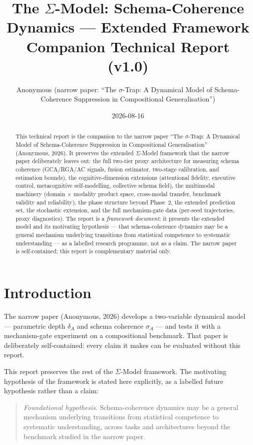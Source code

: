 \documentclass[11pt]{article}
\title{The $\Sigma$-Model: Schema-Coherence Dynamics --- Extended Framework\\
\large Companion Technical Report (v1.0)}
\author{Anonymous (narrow paper: ``The $\sigma$-Trap: A Dynamical Model of
Schema-Coherence Suppression in Compositional Generalisation'')}
\date{2026-08-16}
\theoremstyle{definition}
\theoremstyle{plain}
\begin{document}
\maketitle

\begin{abstract}
This technical report is the companion to the narrow paper ``The
$\sigma$-Trap: A Dynamical Model of Schema-Coherence Suppression in
Compositional Generalisation'' (Anonymous, 2026). It preserves the extended
$\Sigma$-Model framework that the narrow paper deliberately leaves out:
the full two-tier proxy architecture for measuring schema coherence
(GCA/RGA/AC signals, fusion estimator, two-stage calibration, and
estimation bounds), the cognitive-dimension extensions (attentional
fidelity, executive control, metacognitive self-modelling, collective
schema field), the multimodal machinery (domain $\times$ modality
product space, cross-modal transfer, benchmark validity and
reliability), the phase structure beyond Phase~2, the extended
prediction set, the stochastic extension, and the full mechanism-gate
data (per-seed trajectories, proxy diagnostics). The report is a
\emph{framework document}: it presents the extended model and its
motivating hypothesis --- that schema-coherence dynamics may be a
general mechanism underlying transitions from statistical competence to
systematic understanding --- as a labelled research programme, not as a
claim. The narrow paper is self-contained; this report is complementary
material only.
\end{abstract}

\section{Introduction}\label{sec:intro}

The narrow paper (Anonymous, 2026) develops a two-variable dynamical model
--- parametric depth $\delta_A$ and schema coherence $\sigma_A$ --- and
tests it with a mechanism-gate experiment on a compositional benchmark.
That paper is deliberately self-contained: every claim it makes can be
evaluated without this report.

This report preserves the rest of the $\Sigma$-Model framework. The
motivating hypothesis of the framework is stated here explicitly, as a
labelled future hypothesis rather than a claim:

\begin{quote}
\emph{Foundational hypothesis.} Schema-coherence dynamics may be a
general mechanism underlying transitions from statistical competence to
systematic understanding, across tasks and architectures beyond the
benchmark studied in the narrow paper.
\end{quote}
\end{document}
